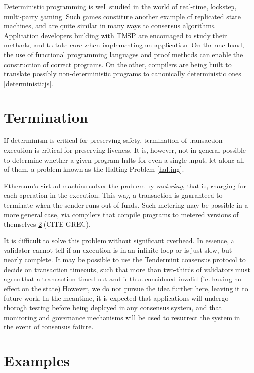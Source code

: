 Deterministic programming is well studied in the world of real-time, lockstep, multi-party gaming.
Such games constitute another example of replicated state machines, and are quite similar in many ways to consensus algorithms.
Application developers building with TMSP are encouraged to study their methods, and to take care when implementing an application.
On the one hand, the use of functional programming languages and proof methods can enable the construction of correct programs.
On the other, compilers are being built to translate possibly non-deterministic programs to canonically deterministic ones \ref{deterministicjs}.

\section{Termination}

If determinism is critical for preserving safety, termination of transaction execution is critical for preserving liveness.
It is, however, not in general possible to determine whether a given program halts for even a single input, let alone all of them,
a problem known as the Halting Problem \ref{halting}.

Ethereum's virtual machine solves the problem by \emph{metering}, that is, charging for each operation in the execution.
This way, a transaction is gauranteed to terminate when the sender runs out of funds.
Such metering may be possible in a more general case, 
via compilers that compile programs to metered versions of themselves \ref{} (CITE GREG).

It is difficult to solve this problem without significant overhead.
In essence, a validator cannot tell if an execution is in an infinite loop or is just slow, but nearly complete.
It may be possible to use the Tendermint consensus protocol to decide on transaction timeouts, 
such that more than two-thirds of validators must agree that a transaction timed out and is thus considered invalid (ie. having no effect on the state)
However, we do not pursue the idea further here, leaving it to future work. 
In the meantime, it is expected that applications will undergo thorogh testing before being deployed in any consensus system,
and that monitoring and governance mechanisms will be used to resurrect the system in the event of consensus failure.

\section{Examples}

